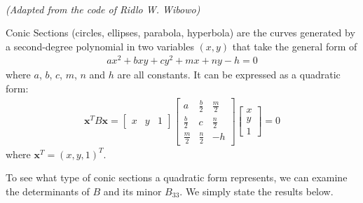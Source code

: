 \begin{center}
\\
\textit{(Adapted from the code of Ridlo W. Wibowo)}
\end{center}
\begin{defn}
\label{defn:conic}
Conic Sections (circles, ellipses, parabola, hyperbola) are the curves generated by a second-degree polynomial in two variables $(x, y)$ that take the general form of
\begin{align*}
ax^2 + bxy + cy^2 + mx + ny - h = 0
\end{align*}
where $a$, $b$, $c$, $m$, $n$ and $h$ are all constants. It can be expressed as a quadratic form:
\begin{align*}
\textbf{x}^T B\textbf{x} = 
\begin{bmatrix}
x & y & 1
\end{bmatrix}
\begin{bmatrix}
a & \frac{b}{2} & \frac{m}{2} \\
\frac{b}{2} & c & \frac{n}{2} \\
\frac{m}{2} & \frac{n}{2} & -h
\end{bmatrix}
\begin{bmatrix}
x \\
y \\
1
\end{bmatrix} = 0
\end{align*}
where $\textbf{x}^T = (x,y,1)^T$.
\end{defn}
To see what type of conic sections a quadratic form represents, we can examine the determinants of $B$ and its minor $B_{33}$. We simply state the results below.
